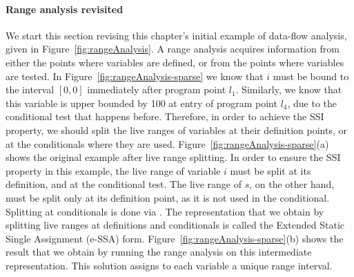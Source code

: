 \paragraph{Range analysis revisited}
We start this section revising this chapter's initial example of data-flow analysis, given in Figure~\ref{fig:rangeAnalysis}.
A range analysis acquires information from either the points where variables are defined, or from the points where variables are tested.
In Figure~\ref{fig:rangeAnalysis-sparse} we know that $i$ must be bound to the interval $[0, 0]$ immediately after program point $l_1$.
Similarly, we know that this variable is upper bounded by 100 at entry of program point $l_4$, due to the conditional test that happens before.
Therefore, in order to achieve the SSI property, we should split the live ranges of variables at their definition points, or at the conditionals where they are used.
Figure~\ref{fig:rangeAnalysis-sparse}(a) shows the original example after live range splitting.
In order to ensure the SSI property in this example, the live range of variable $i$ must be split at its definition, and at the conditional test.
The live range of $s$, on the other hand, must be split only at its definition point, as it is not used in the conditional.
Splitting at conditionals is done via \sigmafuns.
The representation that we obtain by splitting live ranges at definitions and conditionals is called the Extended Static Single Assignment (e-SSA) form.
Figure~\ref{fig:rangeAnalysis-sparse}(b) shows the result that we obtain by running the range analysis on this intermediate representation.
This solution assigns to each variable a unique range interval.

